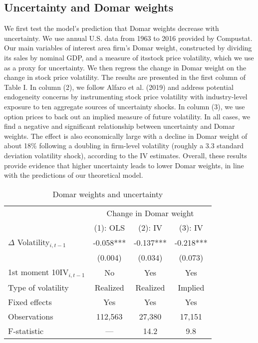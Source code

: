 \documentclass[11pt]{article}
\theoremstyle{definition}
\begin{document}
	\subsection{Uncertainty and Domar weights}
	We first test the model’s prediction that Domar weights decrease with uncertainty. We use annual U.S. data from 1963 to 2016 provided by Compustat. Our main variables of interest area firm’s Domar weight, constructed by dividing its sales by nominal GDP, and a measure of itsstock price volatility, which we use as a proxy for uncertainty. We then regress the change in Domar weight on the change in stock price volatility. The results are presented in the first column of Table I. In column (2), we follow Alfaro et al. (2019) and address potential endogeneity concerns by instrumenting stock price volatility with industry-level exposure to ten aggregate sources of uncertainty shocks. In column (3), we use option prices to back out an implied measure of future volatility. In all cases, we find a negative and significant relationship between uncertainty and Domar weights. The effect is also economically large with a decline in Domar weight of about 18\% following a doubling in firm-level volatility (roughly a 3.3 standard deviation volatility shock), according to the IV estimates. Overall, these results provide evidence that higher uncertainty leads to lower Domar weights, in line with the predictions of our theoretical model.
	
	\begin{table}[ht]
		\centering
		\caption{Domar weights and uncertainty}
		\begin{tabular}{lccc}
			\hline
			& \multicolumn{3}{c}{Change in Domar weight} \\
			\cline{2-4}
			& (1): OLS & (2): IV & (3): IV \\
			\hline
			$\Delta$ Volatility$_{i,t-1}$ & -0.058*** & -0.137*** & -0.218*** \\
			& (0.004) & (0.034) & (0.073) \\
			1st moment 10IV$_{i,t-1}$ & No & Yes & Yes \\
			Type of volatility & Realized & Realized & Implied \\
			Fixed effects & Yes & Yes & Yes \\
			Observations & 112,563 & 27,380 & 17,151 \\
			F-statistic & --- & 14.2 & 9.8 \\
			\hline
		\end{tabular}
	\end{table}
	
\end{document}
